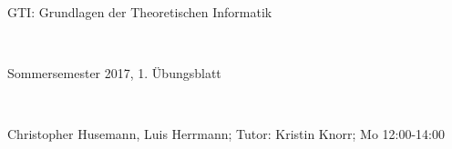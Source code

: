 \documentclass{article}
\begin{document}
	
	\hrulefill
	\begin{center}
		\bfseries %
		\sffamily %
		\begin{huge}
			GTI: Grundlagen der Theoretischen Informatik
		\end{huge}\\
		\begin{Large}
			Sommersemester 2017, 1. Übungsblatt
		\end{Large}\\
		\begin{small}
			Christopher Husemann, Luis Herrmann; Tutor: Kristin Knorr; Mo 12:00-14:00
		\end{small}
		
		\vspace{-10pt}
	\end{center}
	\hrulefill
	
\end{document}
